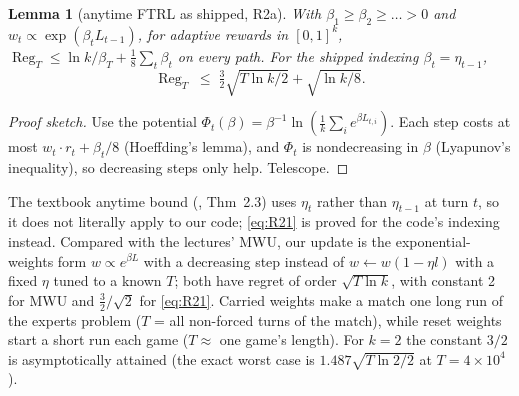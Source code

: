 \documentclass[10pt]{article}
\theoremstyle{plain}
\newtheorem{lemma}[theorem]{Lemma}
\theoremstyle{definition}
\theoremstyle{remark}
\DeclareMathOperator{\Reg}{Reg}
\begin{document}
\begin{lemma}[anytime FTRL as shipped, R2a]\label{lem:R2}
With $\beta_1\ge\beta_2\ge\dots>0$ and $w_t\propto\exp(\beta_tL_{t-1})$, for adaptive rewards in $[0,1]^k$, $\Reg_T\le\ln k/\beta_T+\frac18\sum_t\beta_t$ on every path. For the shipped indexing $\beta_t=\eta_{t-1}$,
\begin{equation}\label{eq:R21}
\Reg_T\;\le\;\tfrac32\sqrt{T\ln k/2}+\sqrt{\ln k/8}.
\end{equation}
\end{lemma}
\begin{proof}[Proof sketch]
Use the potential $\Phi_t(\beta)=\beta^{-1}\ln(\frac1k\sum_ie^{\beta L_{t,i}})$. Each step costs at most $w_t\cdot r_t+\beta_t/8$ (Hoeffding's lemma), and $\Phi_t$ is nondecreasing in $\beta$ (Lyapunov's inequality), so decreasing steps only help. Telescope.
\end{proof}
The textbook anytime bound (\cite{CBL06}, Thm~2.3) uses $\eta_t$ rather than $\eta_{t-1}$ at turn $t$, so it does not literally apply to our code; \eqref{eq:R21} is proved for the code's indexing instead.
Compared with the lectures' MWU, our update is the exponential-weights form $w\propto e^{\beta L}$ with a decreasing step instead of $w\leftarrow w(1-\eta l)$ with a fixed $\eta$ tuned to a known $T$; both have regret of order $\sqrt{T\ln k}$, with constant 2 for MWU and $\frac32/\sqrt2$ for \eqref{eq:R21}. Carried weights make a match one long run of the experts problem ($T$ = all non-forced turns of the match), while reset weights start a short run each game ($T\approx$ one game's length). For $k=2$ the constant $3/2$ is asymptotically attained (the exact worst case is $1.487\sqrt{T\ln 2/2}$ at $T=4\times10^4$).
\end{document}
